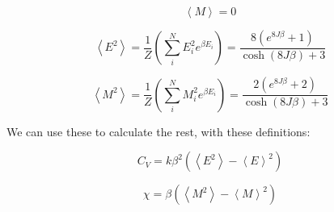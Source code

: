\[
\left< M \right> = 0
\]

\[
\left< E^2 \right> = \frac{1}{Z} \left( \sum_i^N E_i^2 e^{\beta E_i}\right) =\frac{8 \left( e^{8J\beta } + 1\right) }{\cosh (8J\beta ) + 3}
\]


\[
\left< M^2 \right> = \frac{1}{Z} \left( \sum_i^N M_i^2 e^{\beta E_i}\right) = \frac{2 \left( e^{8J\beta } + 2\right) }{\cosh (8J\beta ) + 3}
\]

We can use these to calculate the rest, with these definitions:

\[
C_V = k \beta^2\left( \left< E^2\right> - \left< E\right>^2 \right)
\]

\[
\chi = \beta \left( \left< M^2\right> - \left< M\right>^2\right)
\]